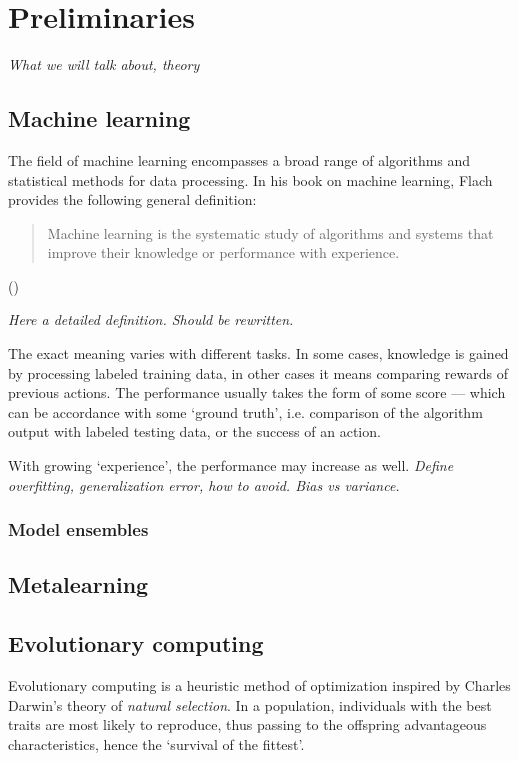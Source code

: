 \chapter{Preliminaries}

\textit{What we will talk about, theory}

\section{Machine learning}
The field of machine learning encompasses a broad range of algorithms and statistical methods for data processing. In his book on machine learning, Flach provides the following general definition:

\blockquote{Machine learning is the systematic study of algorithms and systems that improve their knowledge or performance with experience.} (\cite{Flach:2012:MLA:2490546}) %

\textit{Here a detailed definition. Should be rewritten.}

The exact meaning varies with different tasks. In some cases, knowledge is gained by processing labeled training data, in other cases it means comparing rewards of previous actions. The performance usually takes the form of some score --- which can be accordance with some `ground truth', i.e. comparison of the algorithm output with labeled testing data, or the success of an action. %


With growing `experience', the performance may increase as well.
\textit{Define overfitting, generalization error, how to avoid. Bias vs variance.}

\subsection{Model ensembles}

\section{Metalearning}


\section{Evolutionary computing}
Evolutionary computing is a heuristic method of optimization inspired by Charles Darwin's theory of \textit{natural selection}. \cite{darwin} In a population, individuals with the best traits are most likely to reproduce, thus passing to the offspring advantageous characteristics, hence the `survival of the fittest'. %

